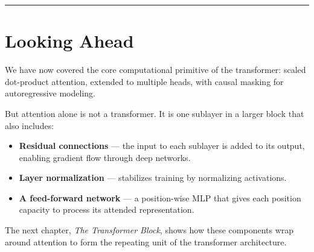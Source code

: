 \bigskip\hrule\bigskip

\section{Looking Ahead}

We have now covered the core computational primitive of the transformer: scaled dot-product attention, extended to multiple heads, with causal masking for autoregressive modeling.

But attention alone is not a transformer. It is one sublayer in a larger block that also includes:

\begin{itemize}
  \item \textbf{Residual connections} --- the input to each sublayer is added to its output, enabling gradient flow through deep networks.
  \item \textbf{Layer normalization} --- stabilizes training by normalizing activations.
  \item \textbf{A feed-forward network} --- a position-wise MLP that gives each position capacity to process its attended representation.
\end{itemize}

The next chapter, \textit{The Transformer Block}, shows how these components wrap around attention to form the repeating unit of the transformer architecture.
